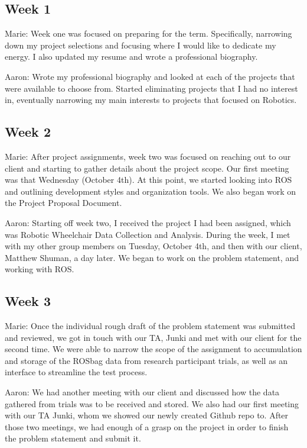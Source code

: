\documentclass[onecolumn, draftclsnofoot,10pt, compsoc]{IEEEtran}
\begin{document}
\subsection{Week 1}
Marie: Week one was focused on preparing for the term. Specifically, narrowing down my project selections and focusing where I would like to dedicate my energy. I also updated my resume and wrote a professional biography.\par

Aaron: Wrote my professional biography and looked at each of the projects that were available to choose from. Started eliminating projects that I had no interest in, eventually narrowing my main interests to projects that focused on Robotics.\par

\subsection{Week 2}
Marie: After project assignments, week two was focused on reaching out to our client and starting to gather details about the project scope. Our first meeting was that Wednesday (October 4th). At this point, we started looking into ROS and outlining development styles and organization tools. We also began work on the Project Proposal Document.\par

Aaron: Starting off week two, I received the project I had been assigned, which was Robotic Wheelchair Data Collection and Analysis. During the week, I met with my other group members on Tuesday, October 4th, and then with our client, Matthew Shuman, a day later. We began to work on the problem statement, and working with ROS.\par

\subsection{Week 3}
Marie: Once the individual rough draft of the problem statement was submitted and reviewed, we got in touch with our TA, Junki and met with our client for the second time. We were able to narrow the scope of the assignment to accumulation and storage of the ROSbag data from research participant trials, as well as an interface to streamline the test process.\par

Aaron: We had another meeting with our client and discussed how the data gathered from trials was to be received and stored. We also had our first meeting with our TA Junki, whom we showed our newly created Github repo to. After those two meetings, we had enough of a grasp on the project in order to finish the problem statement and submit it.\par
\end{document}
